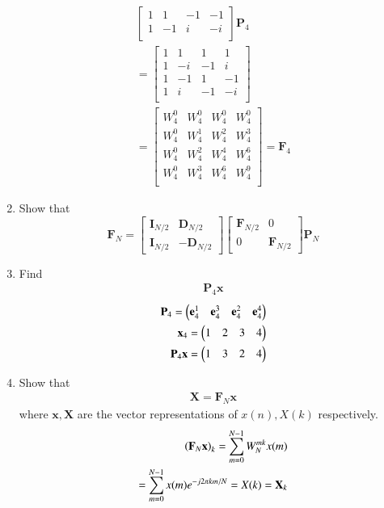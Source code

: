 \documentclass[journal,12pt,twocolumn]{IEEEtran}
\let\vec\mathbf
\renewcommand\thesection{\arabic{section}}
\begin{document}
\begin{enumerate}[label=\arabic*.,ref=\thesection.\theenumi]
\begin{align}
\begin{bmatrix}
		1	&	1	&	-1	&	-1\\
		1	&	-1	&	i	&	-i\\
	\end{bmatrix}\vec{P}_{4}\\
		=\begin{bmatrix}
			1	&	1	&	1	&	1\\
			1	&	-i	&	-1	&	i\\
			1	&	-1	&	1	&	-1\\
			1	&	i	&	-1	&	-i\\
		\end{bmatrix}\\
	= \begin{bmatrix}
		W_{4}^0	&	W_{4}^0	&	W_{4}^0	&	W_{4}^0\\
		W_{4}^0	&	W_{4}^1	&	W_{4}^2	&	W_{4}^3\\
		W_{4}^0	&	W_{4}^2	&	W_{4}^4	&	W_{4}^6\\
		W_{4}^0	&	W_{4}^3	&	W_{4}^6	&	W_{4}^9\\
	\end{bmatrix} = \vec{F}_{4}
\end{align}
\item Show that 
\begin{equation}
	\vec{F}_{N}=
	\begin{bmatrix}
		\vec{I}_{N/2} & \vec{D}_{N/2} \\
		\vec{I}_{N/2} & -\vec{D}_{N/2}
	\end{bmatrix}
	\begin{bmatrix}
		\vec{F}_{N/2} & 0 \\
		0 & \vec{F}_{N/2}
	\end{bmatrix}
	\vec{P}_{N}
\end{equation}
\item Find 
\begin{align}
	\vec{P}_4 \vec{x}
\end{align}
	\solution
\begin{align}
	\vec{P}_{4} = \myvec{\vec{e}_4^{1} &\vec{e}_4^{3} &\vec{e}_4^{2}	&\vec{e}_4^{4}}\\
	\vec{x}_4 = \myvec{1 & 2 & 3 & 4}\\%
	\vec{P}_{4}	\vec{x} = \myvec{1 & 3 & 2 & 4}
\end{align}

\item Show that 
\begin{align}
	\vec{X} = \vec{F}_N \vec{x}
	\label{eq:dft-mat-def}
\end{align}
where $\vec{x}, \vec{X}$ are the vector representations of $x(n), X(k)$ respectively.\\
\solution
\begin{align}
	\brak{\vec{F}_{N}\vec{x}}_{k} = \sum_{m=0}^{N-1}W_{N}^{mk}x(m)\\
	 = \sum_{m=0}^{N-1} x(m) e^{-j 2 \pi k m / N}
	 = X(k) = \vec{X}_{k} 
\end{align}


\end{enumerate}
\end{document}
